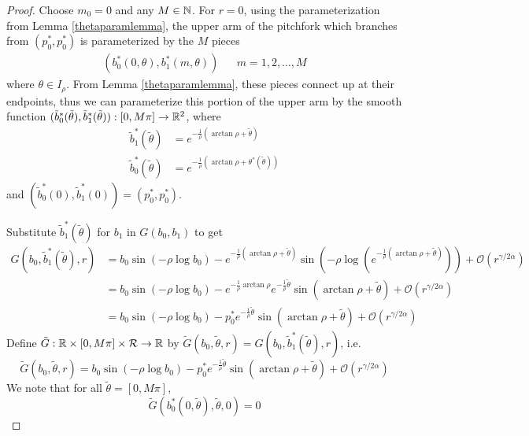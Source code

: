 \documentclass[thesis.tex]{subfiles}
\begin{document}
\begin{lemma}
\begin{proof}
Choose $m_0 = 0$ and any $M \in {\mathbb N}$. For $r = 0$, using the parameterization from Lemma \ref{thetaparamlemma}, the upper arm of the pitchfork which branches from $(p_0^*, p_0^*)$ is parameterized by the $M$ pieces
\begin{align}\label{Mpieceparam}
(b_0^*(0, \theta), b_1^*(m, \theta)) && m = 1, 2, \dots, M
\end{align}
where $\theta \in I_\rho$. From Lemma \ref{thetaparamlemma}, these pieces connect up at their endpoints, thus we can parameterize this portion of the upper arm by the smooth function $(\tilde{b}^*_0(\tilde{\theta}), \tilde{b}^*_1(\tilde{\theta})): [0, M \pi] \rightarrow {\mathbb R}^2$, where 
\begin{align*}
\tilde{b}_1^*(\tilde{\theta}) &= e^{-\frac{1}{\rho}(\arctan \rho +\tilde{\theta})} \\
\tilde{b}_0^*(\tilde{\theta}) &= e^{-\frac{1}{\rho}(\arctan \rho + \theta^*(\tilde{\theta}))}
\end{align*}
and $(\tilde{b}^*_0(0), \tilde{b}^*_1(0)) = (p_0^*, p_0^*)$.

Substitute $\tilde{b}_1^*(\tilde{\theta})$ for $b_1$ in $G(b_0, b_1)$ to get
\begin{align*}
G(b_0, \tilde{b}_1^*(\tilde{\theta}), r) 
&= b_0 \sin(-\rho \log b_0) - e^{-\frac{1}{\rho}(\arctan \rho + \tilde{\theta})} \sin\left(-\rho \log \left( e^{-\frac{1}{\rho}(\arctan \rho + \tilde{\theta})}\right)\right) + \mathcal{O}(r^{\gamma/2\alpha}) \\
&= b_0 \sin(-\rho \log b_0) - e^{-\frac{1}{\rho}\arctan \rho}e^{-\frac{1}{\rho}\tilde{\theta}} \sin\left(\arctan \rho + \tilde{\theta} \right) + \mathcal{O}(r^{\gamma/2\alpha}) \\
&= b_0 \sin(-\rho \log b_0) - p_0^* e^{-\frac{1}{\rho}\tilde{\theta}} \sin\left(\arctan \rho + \tilde{\theta} \right) + \mathcal{O}(r^{\gamma/2\alpha}) 
\end{align*}
Define $\tilde{G}: {\mathbb R} \times [0, M \pi] \times \mathcal{R} \rightarrow {\mathbb R}$ by 
$\tilde{G}(b_0, \tilde{\theta}, r) = G(b_0, \tilde{b}_1^*(\tilde{\theta}), r)$, i.e.
\begin{equation}\label{tildeGdef}
\tilde{G}(b_0, \tilde{\theta}, r) = b_0 \sin(-\rho \log b_0) - p_0^* e^{-\frac{1}{\rho}\tilde{\theta}} \sin\left(\arctan \rho + \tilde{\theta} \right) + \mathcal{O}(r^{\gamma/2\alpha}) 
\end{equation}
We note that for all $\tilde{\theta} = [0, M \pi]$,
\[
\tilde{G}(b_0^*(0, \tilde{\theta}), \tilde{\theta}, 0) = 0
\]


\end{proof}
\end{lemma}
\end{document}
